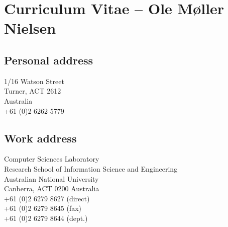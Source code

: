 \documentclass[12pt,a4paper]{article}
\begin{document}
\section*{Curriculum Vitae -- Ole M{\o}ller Nielsen}

\subsection*{Personal address}
1/16 Watson Street \\
Turner, ACT 2612 \\
Australia \\
+61 (0)2 6262 5779  

\subsection*{Work address}
Computer Sciences Laboratory \\
Research School of Information Science and Engineering \\
Australian National University \\
Canberra, ACT 0200
Australia \\
+61 (0)2 6279 8627 (direct)\\
+61 (0)2 6279 8645 (fax)\\
+61 (0)2 6279 8644 (dept.)
 


\end{document}

